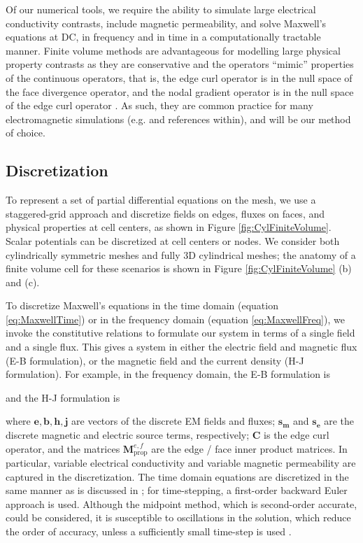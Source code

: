 Of our numerical tools, we require the ability to simulate large electrical conductivity contrasts, include magnetic permeability, and solve Maxwell’s equations at DC, in frequency and in time in a computationally tractable manner. Finite volume methods are advantageous for modelling large physical property contrasts as they are conservative and the operators ``mimic'' properties of the continuous operators, that is, the edge curl operator is in the null space of the face divergence operator, and the nodal gradient operator is in the null space of the edge curl operator \citep{Hyman1999}. As such, they are common practice for many electromagnetic simulations (e.g. \cite{Horesh2011, Haber2014, Jahandari2014} and references within), and will be our method of choice.



\subsection{Discretization}
To represent a set of partial differential equations on the mesh, we use a staggered-grid approach \citep{Yee1966} and discretize fields on edges, fluxes on faces, and physical properties at cell centers, as shown in Figure \ref{fig:CylFiniteVolume}. Scalar potentials can be discretized at cell centers or nodes. We consider both cylindrically symmetric meshes and fully 3D cylindrical meshes; the anatomy of a finite volume cell for these scenarios is shown in Figure \ref{fig:CylFiniteVolume} (b) and (c).




To discretize Maxwell's equations in the time domain (equation \ref{eq:MaxwellTime}) or in the frequency domain (equation \ref{eq:MaxwellFreq}), we invoke the constitutive relations to formulate our system in terms of a single field and a single flux. This gives a system in either the electric field and magnetic flux (E-B formulation), or the magnetic field and the current density (H-J formulation). For example, in the frequency domain, the E-B formulation is

and the H-J formulation is

where $\mathbf{e}, \mathbf{b}, \mathbf{h}, \mathbf{j}$ are vectors of the discrete EM fields and fluxes; $\mathbf{s_m}$ and $\mathbf{s_e}$ are the discrete magnetic and electric source terms, respectively; $\mathbf{C}$ is the edge curl operator, and the matrices $\mathbf{M}_{\text{prop}}^{e,f}$ are the edge / face inner product matrices. In particular, variable electrical conductivity and variable magnetic permeability are captured in the discretization. The time domain equations are discretized in the same manner as is discussed in \citep{Heagy2017}; for time-stepping, a first-order backward Euler approach is used. Although the midpoint method, which is second-order accurate, could be considered, it is susceptible to oscillations in the solution, which reduce the order of accuracy, unless a sufficiently small time-step is used \citep{Haber2004, Haber2014}.

